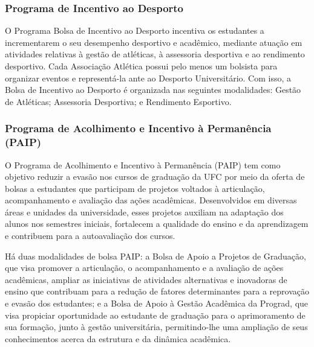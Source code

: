 
\subsubsection{Programa de Incentivo ao Desporto}

O Programa Bolsa de Incentivo ao Desporto incentiva os estudantes a incrementarem o seu desempenho desportivo e acadêmico, mediante atuação em atividades relativas à gestão de atléticas, à assessoria desportiva e ao rendimento desportivo. Cada Associação Atlética possui pelo menos um bolsista para organizar eventos e representá-la ante ao Desporto Universitário. Com isso, a Bolsa de Incentivo ao Desporto é organizada nas seguintes modalidades: Gestão de Atléticas; Assessoria Desportiva; e Rendimento Esportivo.

\subsubsection{Programa de Acolhimento e Incentivo à Permanência (PAIP)}

O Programa de Acolhimento e Incentivo à Permanência (PAIP) tem como objetivo reduzir a evasão nos cursos de graduação da UFC por meio da oferta de bolsas a estudantes que participam de projetos voltados à articulação, acompanhamento e avaliação das ações acadêmicas. Desenvolvidos em diversas áreas e unidades da universidade, esses projetos auxiliam na adaptação dos alunos nos semestres iniciais, fortalecem a qualidade do ensino e da aprendizagem e contribuem para a autoavaliação dos cursos.

Há duas modalidades de bolsa PAIP: a Bolsa de Apoio a Projetos de Graduação, que visa promover a articulação, o acompanhamento e a avaliação de ações acadêmicas,  ampliar as iniciativas de atividades alternativas e inovadoras de ensino que contribuam para a redução de fatores determinantes para a reprovação e evasão dos estudantes; e a Bolsa de Apoio à Gestão Acadêmica da Prograd, que visa propiciar oportunidade ao estudante de graduação para o aprimoramento de sua formação, junto à gestão universitária, permitindo-lhe uma ampliação de seus conhecimentos acerca da estrutura e da dinâmica acadêmica. 


